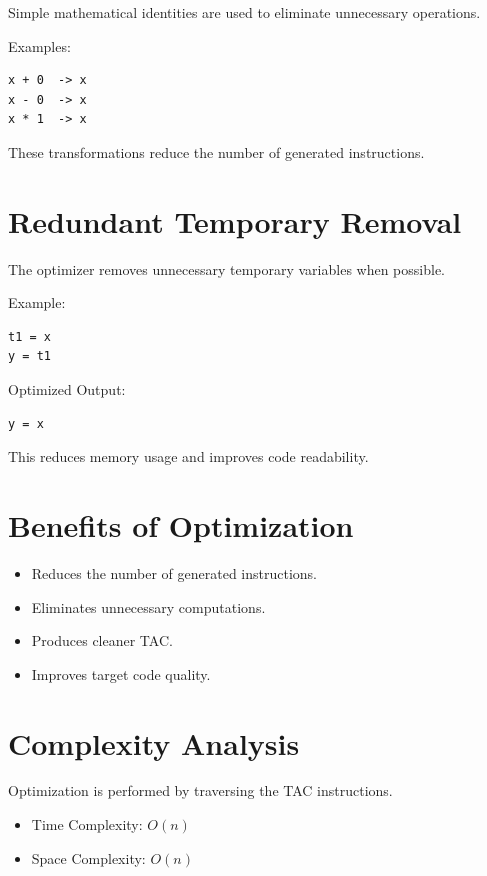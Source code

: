 \documentclass[12pt,a4paper]{report}
\begin{document}
Simple mathematical identities are used to eliminate unnecessary operations.

Examples:

\begin{lstlisting}
x + 0  -> x
x - 0  -> x
x * 1  -> x
\end{lstlisting}

These transformations reduce the number of generated instructions.

\section{Redundant Temporary Removal}

The optimizer removes unnecessary temporary variables when possible.

Example:

\begin{lstlisting}
t1 = x
y = t1
\end{lstlisting}

Optimized Output:

\begin{lstlisting}
y = x
\end{lstlisting}

This reduces memory usage and improves code readability.

\section{Benefits of Optimization}

\begin{itemize}
    \item Reduces the number of generated instructions.
    \item Eliminates unnecessary computations.
    \item Produces cleaner TAC.
    \item Improves target code quality.
\end{itemize}

\section{Complexity Analysis}

Optimization is performed by traversing the TAC instructions.

\begin{itemize}
    \item Time Complexity: \(O(n)\)
    \item Space Complexity: \(O(n)\)
\end{itemize}
\end{document}
